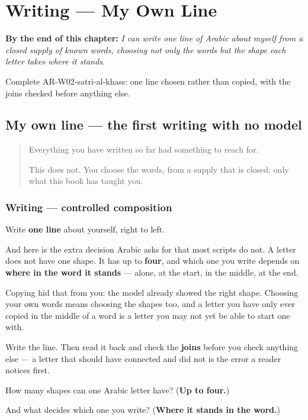 
\chapter{Writing --- My Own Line}
\label{ch:ar-satri-al-khass}

\begin{chapteropening}
\textbf{By the end of this chapter:} \emph{I can write one line of Arabic about myself from a closed supply of known words, choosing not only the words but the shape each letter takes where it stands.}

Complete AR-W02-satri-al-khass: one line chosen rather than copied, with the joins checked before anything else.
\end{chapteropening}

\section[(my own line)]{My own line — the first writing with no model}

\label{lesson:AR-W02-satri-al-khass}



\begin{quote}
Everything you have written so far had something to reach for.

This does not. You choose the words, from a supply that is closed: only what this book has taught you.
\end{quote}

\subsection*{Writing — controlled composition}
Write \textbf{one line} about yourself, right to left.

And here is the extra decision Arabic asks for that most scripts do not. A letter does not have one shape. It has up to \textbf{four}, and which one you write depends on \textbf{where in the word it stands} — alone, at the start, in the middle, at the end.

Copying hid that from you: the model already showed the right shape. Choosing your own words means choosing the shapes too, and a letter you have only ever copied in the middle of a word is a letter you may not yet be able to start one with.

Write the line. Then read it back and check the \textbf{joins} before you check anything else — a letter that should have connected and did not is the error a reader notices first.

\begin{tcolorbox}[breakable,colback=teal!4,colframe=teal!35!black,title={Before you move on}]
How many shapes can one Arabic letter have? (\textbf{Up to four.})

And what decides which one you write? (\textbf{Where it stands in the word.})
\end{tcolorbox}
